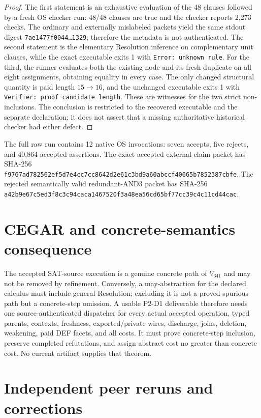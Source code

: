 \documentclass[11pt]{article}
\begin{document}
\begin{proof}
The first statement is an exhaustive evaluation of the 48 clauses followed by a
fresh OS checker run: 48/48 clauses are true and the checker reports 2,273 checks.
The ordinary and externally mislabeled packets yield the same stdout digest
\texttt{7ae1477f0044\ldots 1329}; therefore the metadata is not authenticated.
The second statement is the elementary Resolution inference on complementary unit
clauses, while the exact executable exits 1 with \texttt{Error: unknown rule}.
For the third, the runner evaluates both the existing node and its fresh duplicate
on all eight assignments, obtaining equality in every case.  The only changed
structural quantity is paid length $15\to16$, and the unchanged executable exits 1
with \texttt{Verifier: proof candidate length}.  These are witnesses for the two
strict non-inclusions.  The conclusion is restricted to the recovered executable
and the separate declaration; it does not assert that a missing authoritative
historical checker had either defect.
\end{proof}

The full raw run contains 12 native OS invocations: seven accepts, five rejects,
and 40,864 accepted assertions.  The exact accepted external-claim packet has
SHA-256 \texttt{f9767ad782562ef5d7e4cc7cc8642d2e61c3bd9a60abccf40665b7852387cbfe}.
The rejected semantically valid redundant-AND3 packet has SHA-256
\texttt{a42b9e67c5ed3f8c3c94caca1467520f3a48ea56cd65bf77cc39c4c11cd44cac}.

\section{CEGAR and concrete-semantics consequence}

The accepted SAT-source execution is a genuine concrete path of $V_{341}$ and may
not be removed by refinement.  Conversely, a may-abstraction for the declared
calculus must include general Resolution; excluding it is not a proved-spurious
path but a concrete-step omission.  A usable P2-D1 deliverable therefore needs one
source-authenticated dispatcher for every actual accepted operation, typed parents,
contexts, freshness, exported/private wires, discharge, joins, deletion, weakening,
paid DEF facets, and all costs.  It must prove concrete-step inclusion, preserve
completed refutations, and assign abstract cost no greater than concrete cost.
No current artifact supplies that theorem.

\section{Independent peer reruns and corrections}
\end{document}
